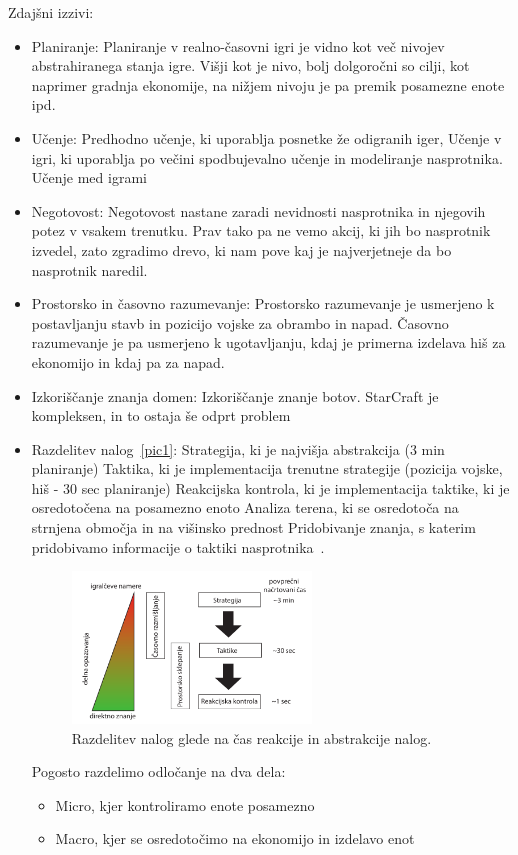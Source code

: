 \documentclass[a4paper, 12pt]{book}
\begin{document}
Zdajšni izzivi:
\begin{itemize}
	\item Planiranje:
	Planiranje v realno-časovni igri je vidno kot več nivojev abstrahiranega stanja igre. Višji kot je nivo, bolj dolgoročni so cilji, kot naprimer gradnja ekonomije, na nižjem nivoju je pa premik posamezne enote ipd.
	\item Učenje:
	Predhodno učenje, ki uporablja posnetke že odigranih iger,
	Učenje v igri, ki uporablja po večini spodbujevalno učenje in modeliranje nasprotnika.
	Učenje med igrami
	\item Negotovost:
	Negotovost nastane zaradi nevidnosti nasprotnika in njegovih potez v vsakem trenutku. Prav tako pa ne vemo akcij, ki jih bo nasprotnik izvedel, zato zgradimo drevo, ki nam pove kaj je najverjetneje da bo nasprotnik naredil.
	\item Prostorsko in časovno razumevanje:
	Prostorsko razumevanje je usmerjeno k postavljanju stavb in pozicijo vojske za obrambo in napad.
	Časovno razumevanje je pa usmerjeno k ugotavljanju, kdaj je primerna izdelava hiš za ekonomijo in kdaj pa za napad.
	\item Izkoriščanje znanja domen:
	Izkoriščanje znanje botov. StarCraft je kompleksen, in to ostaja še odprt problem
	\item Razdelitev nalog~\ref{pic1}:
	Strategija, ki je najvišja abstrakcija (3 min planiranje)
	Taktika, ki je implementacija trenutne strategije (pozicija vojske, hiš - 30 sec planiranje)
	Reakcijska kontrola, ki je implementacija taktike, ki je osredotočena na posamezno enoto
	Analiza terena, ki se osredotoča na strnjena območja in na višinsko prednost
	Pridobivanje znanja, s katerim pridobivamo informacije o taktiki nasprotnika~\cite{survey_real_time_strategy_ai_research_starcraft}.
	
	\begin{figure}[h]
		\begin{center}
			\includegraphics[width=0.6\textwidth]{RazdelitevNalog.pdf}
		\end{center}
		\caption{Razdelitev nalog glede na čas reakcije in abstrakcije nalog.}
		\label{picRazdelitevNalog}
	\end{figure}
	
	Pogosto razdelimo odločanje na dva dela:
	\begin{itemize}
		\item Micro, kjer kontroliramo enote posamezno
		\item Macro, kjer se osredotočimo na ekonomijo in izdelavo enot
	\end{itemize}
\end{itemize}
\end{document}
